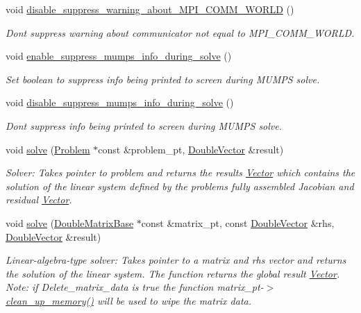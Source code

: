 \begin{DoxyCompactItemize}
void \hyperlink{classoomph_1_1MumpsSolver_ade6f5dff6fddd0eeef6ef051ab5dfbc1}{disable\+\_\+suppress\+\_\+warning\+\_\+about\+\_\+\+M\+P\+I\+\_\+\+C\+O\+M\+M\+\_\+\+W\+O\+R\+LD} ()
\begin{DoxyCompactList}\small\item\em Don\textquotesingle{}t suppress warning about communicator not equal to M\+P\+I\+\_\+\+C\+O\+M\+M\+\_\+\+W\+O\+R\+LD. \end{DoxyCompactList}\item 
void \hyperlink{classoomph_1_1MumpsSolver_a9be151628e1d8b488441ce2455f888e1}{enable\+\_\+suppress\+\_\+mumps\+\_\+info\+\_\+during\+\_\+solve} ()
\begin{DoxyCompactList}\small\item\em Set boolean to suppress info being printed to screen during M\+U\+M\+PS solve. \end{DoxyCompactList}\item 
void \hyperlink{classoomph_1_1MumpsSolver_ad75c9ff36be18867a88e0a68fac68f7c}{disable\+\_\+suppress\+\_\+mumps\+\_\+info\+\_\+during\+\_\+solve} ()
\begin{DoxyCompactList}\small\item\em Don\textquotesingle{}t suppress info being printed to screen during M\+U\+M\+PS solve. \end{DoxyCompactList}\item 
void \hyperlink{classoomph_1_1MumpsSolver_ae0346a464f3ed74bfcca4063bdeed3ad}{solve} (\hyperlink{classoomph_1_1Problem}{Problem} $\ast$const \&problem\+\_\+pt, \hyperlink{classoomph_1_1DoubleVector}{Double\+Vector} \&result)
\begin{DoxyCompactList}\small\item\em Solver\+: Takes pointer to problem and returns the results \hyperlink{classoomph_1_1Vector}{Vector} which contains the solution of the linear system defined by the problem\textquotesingle{}s fully assembled Jacobian and residual \hyperlink{classoomph_1_1Vector}{Vector}. \end{DoxyCompactList}\item 
void \hyperlink{classoomph_1_1MumpsSolver_a3995dcf46675fc443b4d373d348a0fdf}{solve} (\hyperlink{classoomph_1_1DoubleMatrixBase}{Double\+Matrix\+Base} $\ast$const \&matrix\+\_\+pt, const \hyperlink{classoomph_1_1DoubleVector}{Double\+Vector} \&rhs, \hyperlink{classoomph_1_1DoubleVector}{Double\+Vector} \&result)
\begin{DoxyCompactList}\small\item\em Linear-\/algebra-\/type solver\+: Takes pointer to a matrix and rhs vector and returns the solution of the linear system. The function returns the global result \hyperlink{classoomph_1_1Vector}{Vector}. Note\+: if Delete\+\_\+matrix\+\_\+data is true the function matrix\+\_\+pt-\/$>$\hyperlink{classoomph_1_1MumpsSolver_adc1541e4a9cbbe9c641f988380618713}{clean\+\_\+up\+\_\+memory()} will be used to wipe the matrix data. \end{DoxyCompactList}\item 

\end{DoxyCompactItemize}
